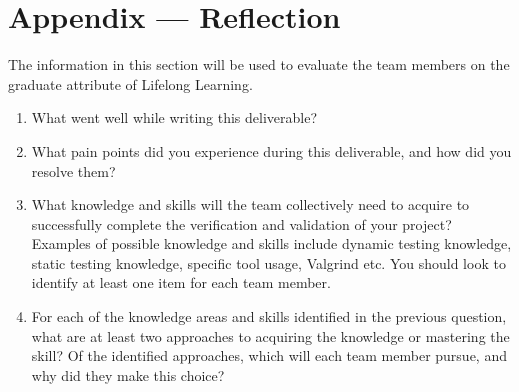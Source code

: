 \documentclass[12pt, titlepage]{article}
\begin{document}
\newpage{}
\section*{Appendix --- Reflection}


The information in this section will be used to evaluate the team members on the
graduate attribute of Lifelong Learning.



\begin{enumerate}
  \item What went well while writing this deliverable? 
  \item What pain points did you experience during this deliverable, and how did
    you resolve them?
  \item What knowledge and skills will the team collectively need to acquire to
  successfully complete the verification and validation of your project?
  Examples of possible knowledge and skills include dynamic testing knowledge,
  static testing knowledge, specific tool usage, Valgrind etc.  You should look
  to identify at least one item for each team member.
  \item For each of the knowledge areas and skills identified in the previous
  question, what are at least two approaches to acquiring the knowledge or
  mastering the skill?  Of the identified approaches, which will each team
  member pursue, and why did they make this choice?
\end{enumerate}
\end{document}
